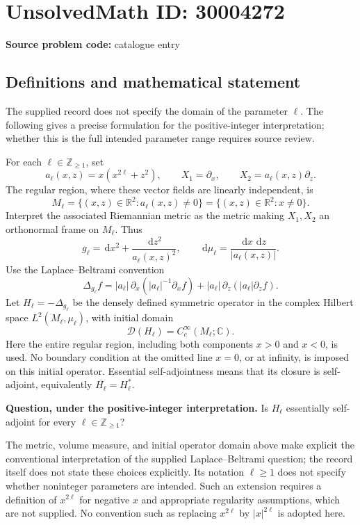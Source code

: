 \documentclass[11pt]{article}
\newcommand{\Z}{\mathbb{Z}}
\newcommand{\R}{\mathbb{R}}
\newcommand{\C}{\mathbb{C}}
\newcommand{\dd}{\,\mathrm{d}}
\begin{document}
\section*{UnsolvedMath ID: 30004272}
\textbf{Source problem code:} catalogue entry
\subsection{Definitions and mathematical statement}
The supplied record does not specify the domain of the parameter \(\ell\). The following gives a precise formulation for the positive-integer interpretation; whether this is the full intended parameter range requires source review.

For each \(\ell\in\Z_{\geq 1}\), set
\[
a_\ell(x,z)=x(x^{2\ell}+z^2),\qquad X_1=\partial_x,\qquad X_2=a_\ell(x,z)\partial_z.
\]
The regular region, where these vector fields are linearly independent, is
\[
M_\ell=\{(x,z)\in\R^2:a_\ell(x,z)\ne0\}=\{(x,z)\in\R^2:x\ne0\}.
\]
Interpret the associated Riemannian metric as the metric making \(X_1,X_2\) an orthonormal frame on \(M_\ell\). Thus
\[
g_\ell=\dd x^2+\frac{\dd z^2}{a_\ell(x,z)^2},\qquad
\dd\mu_\ell=\frac{\dd x\,\dd z}{|a_\ell(x,z)|}.
\]
Use the Laplace--Beltrami convention
\[
\Delta_{g_\ell}f
=|a_\ell|\,\partial_x\!\left(|a_\ell|^{-1}\partial_x f\right)
 +|a_\ell|\,\partial_z\!\left(|a_\ell|\partial_z f\right).
\]
Let \(H_\ell=-\Delta_{g_\ell}\) be the densely defined symmetric operator in the complex Hilbert space \(L^2(M_\ell,\mu_\ell)\), with initial domain
\[
\mathcal D(H_\ell)=C_c^\infty(M_\ell;\C).
\]
Here the entire regular region, including both components \(x>0\) and \(x<0\), is used. No boundary condition at the omitted line \(x=0\), or at infinity, is imposed on this initial operator. Essential self-adjointness means that its closure is self-adjoint, equivalently \(\overline{H_\ell}=H_\ell^*\).

\textbf{Question, under the positive-integer interpretation.} Is \(H_\ell\) essentially self-adjoint for every \(\ell\in\Z_{\geq1}\)?

The metric, volume measure, and initial operator domain above make explicit the conventional interpretation of the supplied Laplace--Beltrami question; the record itself does not state these choices explicitly. Its notation \(\ell\geq1\) does not specify whether noninteger parameters are intended. Such an extension requires a definition of \(x^{2\ell}\) for negative \(x\) and appropriate regularity assumptions, which are not supplied. No convention such as replacing \(x^{2\ell}\) by \(|x|^{2\ell}\) is adopted here.
\end{document}
